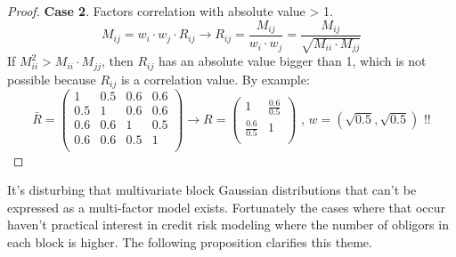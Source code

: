 \documentclass[11pt,fleqn]{book} %
\begin{document}
\begin{proof}
	\textbf{Case 2}. Factors correlation with absolute value > 1.
	\begin{displaymath}
		M_{ij} = w_i \cdot w_j \cdot R_{ij} \longrightarrow 
		R_{ij} = \frac{M_{ij}}{w_i \cdot w_j} = 
		\frac{M_{ij}}{\sqrt{M_{ii} \cdot M_{jj}}}
	\end{displaymath}
	If $M_{ii}^2 > M_{ii} \cdot M_{jj}$, then $R_{ij}$ has an absolute value
	bigger than 1, which is not possible because $R_{ij}$ is a correlation
	value. By example:
	\begin{displaymath}
		\bar{R} = \left(
		\begin{array}{cc|cc}
			1   & 0.5 & 0.6 & 0.6 \\
			0.5 & 1   & 0.6 & 0.6 \\
			\hline
			0.6 & 0.6 & 1   & 0.5 \\
			0.6 & 0.6 & 0.5 & 1   \\
		\end{array}
		\right) 
		\longrightarrow
		R = \left(
		\begin{array}{cc}
			1               & \frac{0.6}{0.5} \\
			\frac{0.6}{0.5} & 1               \\
		\end{array}
		\right)
		\text{ , }
		w = (\sqrt{0.5}, \sqrt{0.5})
		\text{ !!}
	\end{displaymath}
\end{proof}

It's disturbing that multivariate block Gaussian distributions 
that can't be expressed as a multi-factor model exists. Fortunately the 
cases where that occur haven't practical interest in credit risk
modeling where the number of obligors in each block is higher. 
The following proposition clarifies this theme.
\end{document}
